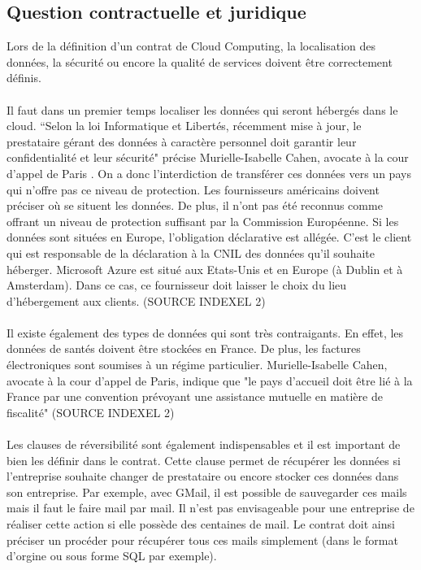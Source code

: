 \documentclass[a4paper,12pt]{report}
\begin{document}
\begin{onehalfspace}
	\section{Question contractuelle et juridique}
	Lors de la définition d’un contrat de Cloud Computing, la localisation des données, la sécurité ou encore la qualité de services doivent être correctement définis.

	\paragraph*{}
	Il faut dans un premier temps localiser les données qui seront hébergés dans le cloud. “Selon la loi Informatique et Libertés, récemment mise à jour, le prestataire gérant des données à caractère personnel doit garantir leur confidentialité et leur sécurité" précise Murielle-Isabelle Cahen, avocate à la cour d'appel de Paris . On a donc l’interdiction de transférer ces données vers un pays qui n’offre pas ce niveau de protection. Les fournisseurs américains doivent préciser où se situent les données. De plus, il n’ont pas été reconnus comme offrant un niveau de protection suffisant par la Commission Européenne. Si les données sont situées en Europe, l’obligation déclarative est allégée. C’est le client qui est responsable de la déclaration à la CNIL des données qu’il souhaite héberger. Microsoft Azure est situé aux Etats-Unis et en Europe (à Dublin et à Amsterdam). Dans ce cas, ce fournisseur doit laisser le choix du lieu d’hébergement aux clients. (SOURCE INDEXEL 2)
	\paragraph*{}
	Il existe également des types de données qui sont très contraigants. En effet, les données de santés doivent être stockées en France. De plus, les factures électroniques sont soumises à un régime particulier. Murielle-Isabelle Cahen, avocate à la cour d'appel de Paris, indique que "le pays d'accueil doit être lié à la France par une convention prévoyant une assistance mutuelle en matière de fiscalité" (SOURCE INDEXEL 2)
	\paragraph*{}
	Les clauses de réversibilité sont également indispensables et il est important de bien les définir dans le contrat. Cette clause permet de récupérer les données si l’entreprise souhaite changer de prestataire ou encore stocker ces données dans son entreprise. Par exemple, avec GMail, il est possible de sauvegarder ces mails mais il faut le faire mail par mail. Il n’est pas envisageable pour une entreprise de réaliser cette action si elle possède des centaines de mail. Le contrat doit ainsi préciser un procéder pour récupérer tous ces mails simplement (dans le format d’orgine ou sous forme SQL par exemple).

\end{onehalfspace}
\end{document}
